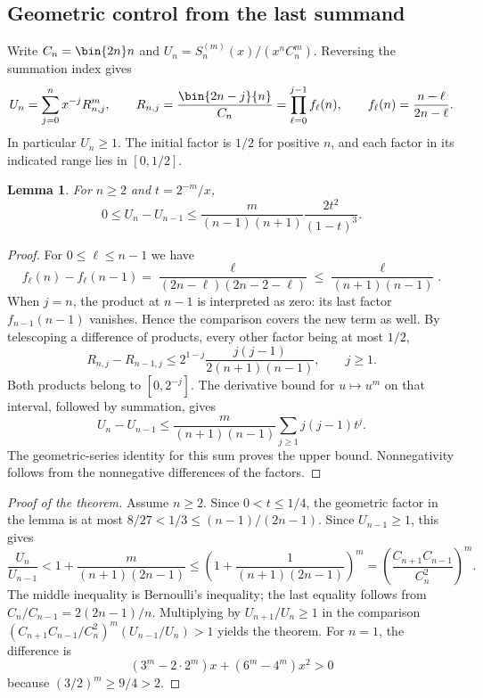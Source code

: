 \documentclass[11pt,a4paper]{article}
\numberwithin{equation}{section}
\newtheorem{lemma}[theorem]{Lemma}
\theoremstyle{definition}
\theoremstyle{remark}
\begin{document}
\subsection{Geometric control from the last summand}
Write $C_n=\bin{2n}n$ and $U_n=S_n^{(m)}(x)/(x^n C_n^m)$. Reversing the summation index gives
\[
 U_n=\sum_{j=0}^n x^{-j} R_{n,j}^m,\qquad
 R_{n,j}=\frac{\bin{2n-j}{n}}{C_n}=\prod_{\ell=0}^{j-1}f_\ell(n),
 \qquad f_\ell(n)=\frac{n-\ell}{2n-\ell}.
\]
In particular $U_n\ge1$. The initial factor is $1/2$ for positive $n$, and each factor in its indicated range lies in $[0,1/2]$.
\begin{lemma}
For $n\ge2$ and $t=2^{-m}/x$,
\[
 0\le U_n-U_{n-1}\le
 \frac{m}{(n-1)(n+1)}\frac{2t^2}{(1-t)^3}.
\]
\end{lemma}
\begin{proof}
For $0\le\ell\le n-1$ we have
\[
 f_\ell(n)-f_\ell(n-1)=
 \frac{\ell}{(2n-\ell)(2n-2-\ell)}
 \le\frac{\ell}{(n+1)(n-1)} .
\]
When $j=n$, the product at $n-1$ is interpreted as zero: its last factor $f_{n-1}(n-1)$ vanishes. Hence the comparison covers the new term as well. By telescoping a difference of products, every other factor being at most $1/2$,
\[
 R_{n,j}-R_{n-1,j}\le
 2^{1-j}\frac{j(j-1)}{2(n+1)(n-1)},\qquad j\ge1.
\]
Both products belong to $[0,2^{-j}]$. The derivative bound for $u\mapsto u^m$ on that interval, followed by summation, gives
\[
 U_n-U_{n-1}\le
 \frac{m}{(n+1)(n-1)}\sum_{j\ge1}j(j-1)t^j .
\]
The geometric-series identity for this sum proves the upper bound. Nonnegativity follows from the nonnegative differences of the factors.
\end{proof}
\begin{proof}[Proof of the theorem]
Assume $n\ge2$. Since $0<t\le1/4$, the geometric factor in the lemma is at most $8/27<1/3\le(n-1)/(2n-1)$. Since $U_{n-1}\ge1$, this gives
\[
 \frac{U_n}{U_{n-1}}<1+\frac{m}{(n+1)(2n-1)}
 \le \left(1+\frac{1}{(n+1)(2n-1)}\right)^m
 =\left(\frac{C_{n+1}C_{n-1}}{C_n^2}\right)^m .
\]
The middle inequality is Bernoulli's inequality; the last equality follows from $C_n/C_{n-1}=2(2n-1)/n$. Multiplying by $U_{n+1}/U_n\ge1$ in the comparison
$(C_{n+1}C_{n-1}/C_n^2)^m(U_{n-1}/U_n)>1$ yields the theorem.
For $n=1$, the difference is
\[
 (3^m-2\cdot2^m)x+(6^m-4^m)x^2>0
\]
because $(3/2)^m\ge9/4>2$.
\end{proof}
\end{document}
